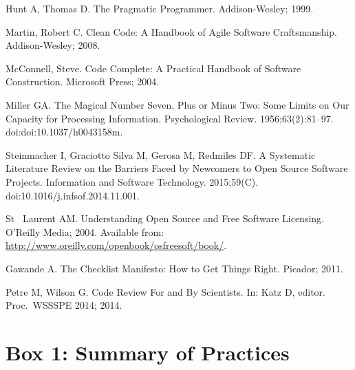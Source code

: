 \documentclass[10pt,letterpaper]{article}
\begin{document}
\begin{thebibliography}{10}
Hunt A, Thomas D.
\newblock The Pragmatic Programmer.
\newblock Addison-Wesley; 1999.

Martin, Robert C.
\newblock Clean Code: A Handbook of Agile Software Craftsmanship.
\newblock Addison-Wesley; 2008.

McConnell, Steve.
\newblock Code Complete: A Practical Handbook of Software Construction.
\newblock Microsoft Press; 2004.

Miller GA.
\newblock The Magical Number Seven, Plus or Minus Two: Some Limits on Our
  Capacity for Processing Information.
\newblock Psychological Review. 1956;63(2):81–97.
\newblock doi:{doi:10.1037/h0043158m}.

Steinmacher I, {Graciotto Silva} M, Gerosa M, Redmiles DF.
\newblock A Systematic Literature Review on the Barriers Faced by Newcomers to
  Open Source Software Projects.
\newblock Information and Software Technology. 2015;59(C).
\newblock doi:{10.1016/j.infsof.2014.11.001}.

{St ~Laurent} AM.
\newblock Understanding Open Source and Free Software Licensing.
\newblock O'Reilly Media; 2004.
\newblock Available from:
  \url{http://www.oreilly.com/openbook/osfreesoft/book/}.

Gawande A.
\newblock The Checklist Manifesto: How to Get Things Right.
\newblock Picador; 2011.

Petre M, Wilson G.
\newblock Code Review For and By Scientists.
\newblock In: Katz D, editor. Proc.\ WSSSPE 2014; 2014.

\end{thebibliography}

\pagebreak

\section*{Box 1: Summary of Practices}
\end{document}
